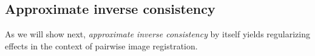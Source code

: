 
\subsection{Approximate inverse consistency} 
\label{subsec:h1_by_approximate_inverse_consistency}

As we will show next, \emph{approximate inverse consistency} by itself yields regularizing effects in the context of pairwise image registration.


